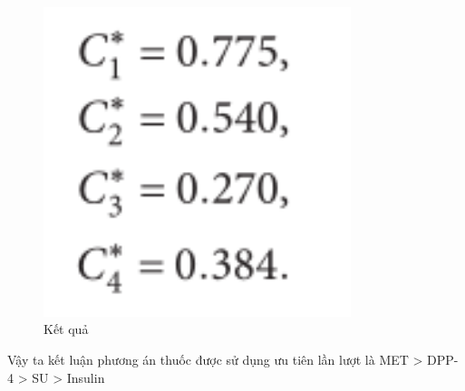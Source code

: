 \documentclass{article}
\begin{document}
\begin{figure}[H]
    \centering
    \includegraphics[width=0.8\textwidth]{o20.png}
    \caption{Kết quả}
    \label{dongco}
\end{figure}
Vậy ta kết luận phương án thuốc được sử dụng ưu tiên lần lượt là MET > DPP-4 > SU > Insulin
\end{document}
